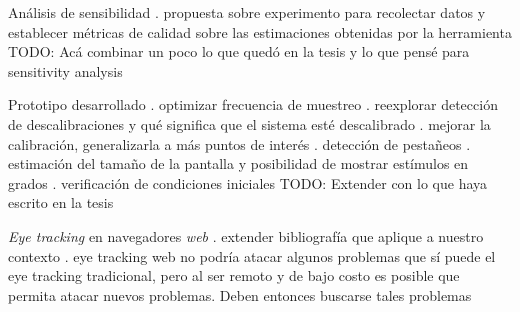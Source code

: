 \documentclass[aspectratio=169]{beamer}
\begin{document}
\begin{frame}{Análisis de sensibilidad}
. propuesta sobre experimento para recolectar datos y establecer métricas de
  calidad sobre las estimaciones obtenidas por la herramienta
TODO: Acá combinar un poco lo que quedó en la tesis y lo que pensé para
      sensitivity analysis
\end{frame}

\begin{frame}{Prototipo desarrollado}
. optimizar frecuencia de muestreo
. reexplorar detección de descalibraciones y qué significa que el sistema esté
  descalibrado
. mejorar la calibración, generalizarla a más puntos de interés
. detección de pestañeos
. estimación del tamaño de la pantalla y posibilidad de mostrar estímulos en
  grados
. verificación de condiciones iniciales
TODO: Extender con lo que haya escrito en la tesis
\end{frame}

\begin{frame}{\textit{Eye tracking} en navegadores \textit{web}}
. extender bibliografía que aplique a nuestro contexto
. eye tracking web no podría atacar algunos problemas que sí puede el eye
  tracking tradicional, pero al ser remoto y de bajo costo es posible que
  permita atacar nuevos problemas. Deben entonces buscarse tales problemas
\end{frame}
\end{document}

